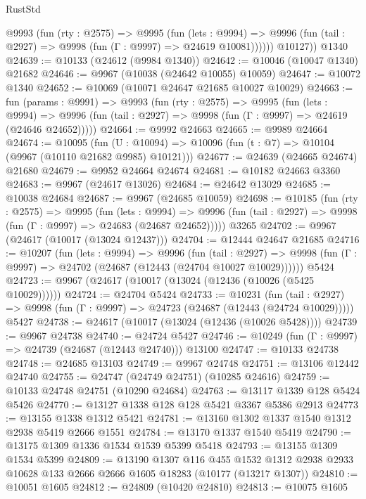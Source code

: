 \begin{lexlean}{RustStd}
\begin{coremodule}
          @9993
            (fun (rty : @2575) =>
            @9995
              (fun (lets : @9994) =>
              @9996 (fun (tail : @2927) => @9998 (fun (Γ : @9997) => @24619 @10081))))))
        @10127))
    @1340
@24639 := @10133 (@24612 (@9984 @1340))
@24642 := @10046 (@10047 @1340) @21682
@24646 := @9967 (@10038 (@24642 @10055) @10059)
@24647 := @10072 @1340
@24652 := @10069 (@10071 @24647 @21685 @10027 @10029)
@24663 := fun (params : @9991) =>
  @9993
    (fun (rty : @2575) =>
    @9995
      (fun (lets : @9994) =>
      @9996 (fun (tail : @2927) => @9998 (fun (Γ : @9997) => @24619 (@24646 @24652)))))
@24664 := @9992 @24663
@24665 := @9989 @24664
@24674 := @10095
    (fun (U : @10094) => @10096 (fun (t : @7) => @10104 (@9967 (@10110 @21682 @9985) @10121)))
@24677 := @24639 (@24665 @24674) @21680
@24679 := @9952 @24664 @24674
@24681 := @10182 @24663 @3360
@24683 := @9967 (@24617 @13026)
@24684 := @24642 @13029
@24685 := @10038 @24684
@24687 := @9967 (@24685 @10059)
@24698 := @10185
    (fun (rty : @2575) =>
    @9995
      (fun (lets : @9994) =>
      @9996 (fun (tail : @2927) => @9998 (fun (Γ : @9997) => @24683 (@24687 @24652)))))
    @3265
@24702 := @9967 (@24617 (@10017 (@13024 @12437)))
@24704 := @12444 @24647 @21685
@24716 := @10207
    (fun (lets : @9994) =>
    @9996
      (fun (tail : @2927) =>
      @9998 (fun (Γ : @9997) => @24702 (@24687 (@12443 (@24704 @10027 @10029))))))
    @5424
@24723 := @9967 (@24617 (@10017 (@13024 (@12436 (@10026 (@5425 @10029))))))
@24724 := @24704 @5424
@24733 := @10231
    (fun (tail : @2927) => @9998 (fun (Γ : @9997) => @24723 (@24687 (@12443 (@24724 @10029)))))
    @5427
@24738 := @24617 (@10017 (@13024 (@12436 (@10026 @5428))))
@24739 := @9967 @24738
@24740 := @24724 @5427
@24746 := @10249 (fun (Γ : @9997) => @24739 (@24687 (@12443 @24740))) @13100
@24747 := @10133 @24738
@24748 := @24685 @13103
@24749 := @9967 @24748
@24751 := @13106 @12442 @24740
@24755 := @24747 (@24749 @24751) (@10285 @24616)
@24759 := @10133 @24748 @24751 (@10290 @24684)
@24763 := @13117 @1339 @128 @5424 @5426
@24770 := @13127 @1338 @128 @128 @5421 @3367 @5386 @2913
@24773 := @13155 @1338 @1312 @5421
@24781 := @13160 @1302 @1337 @1540 @1312 @2938 @5419 @2666 @1551
@24784 := @13170 @1337 @1540 @5419
@24790 := @13175 @1309 @1336 @1534 @1539 @5399 @5418
@24793 := @13155 @1309 @1534 @5399
@24809 := @13190
    @1307
    @116
    @455
    @1532
    @1312
    @2938
    @2933
    @10628
    @133
    @2666
    @2666
    @1605
    @18283
    (@10177 (@13217 @1307))
@24810 := @10051 @1605
@24812 := @24809 (@10420 @24810)
@24813 := @10075 @1605

\end{coremodule}
\end{lexlean}

